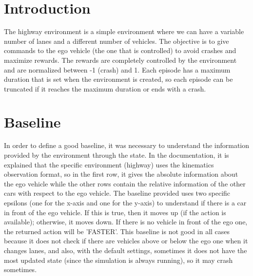 \documentclass{article}
\begin{document}

\begin{abstract}
This project investigates the possibility of using a reinforcement learning agent to avoid crashes in the given highway environment \cite{highway-env}. This project compares the output of the best RL agent found with a specific baseline and with the human controlling the car. The baseline explained in Section \ref{section:Baseline} is defined in order to be an informed guess of the action that must be taken. To find the best RL agent, three different approaches are investigated: Double Deep Q-Network (DQN), Dueling Deep Q-Network (DQN), and Proximal Policy Optimization (PPO). These 3 approaches are presented in Section \ref{section:Approaches}. The code is available at \cite{code}.
\end{abstract}

\section{Introduction} \label{section:Introduction}
The highway environment \cite{highway-env} is a simple environment where we can have a variable number of lanes and a different number of vehicles. The objective is to give commands to the ego vehicle (the one that is controlled) to avoid crashes and maximize rewards. The rewards are completely controlled by the environment and are normalized between -1 (crash) and 1. Each episode has a maximum duration that is set when the environment is created, so each episode can be truncated if it reaches the maximum duration or ends with a crash.

\section{Baseline}\label{section:Baseline}
In order to define a good baseline, it was necessary to understand the information provided by the environment \cite{highway-env} through the state. In the documentation, it is explained that the specific environment (highway) uses the kinematics observation format, so in the first row, it gives the absolute information about the ego vehicle while the other rows contain the relative information of the other cars with respect to the ego vehicle.
The baseline provided uses two specific epsilons (one for the x-axis and one for the y-axis) to understand if there is a car in front of the ego vehicle. If this is true, then it moves up (if the action is available); otherwise, it moves down. If there is no vehicle in front of the ego one, the returned action will be 'FASTER'.
This baseline is not good in all cases because it does not check if there are vehicles above or below the ego one when it changes lanes, and also, with the default settings, sometimes it does not have the most updated state (since the simulation is always running), so it may crash sometimes.
\end{document}
